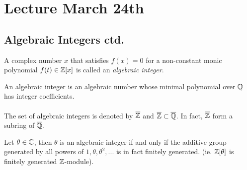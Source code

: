 \section{Lecture March 24th}

\subsection{Algebraic Integers ctd.}

 \begin{definition}
 A complex number $x$ that satisfies $f(x) = 0$ for a non-constant monic polynomial $f(t) \in \mathbb{Z}[x]$ is called an \textit{algebraic integer}.
 \end{definition}
 
 \begin{definition}
 An algebraic integer is an algebraic number whose minimal polynomial over $\mathbb{Q}$ has integer coefficients.\\\\
 The set of algebraic integers is denoted by $\overline{\mathbb{Z}}$ and $\overline{\mathbb{Z}} \subset \overline{\mathbb{Q}}$. In fact, $\overline{\mathbb{Z}}$ form a subring of $\overline{\mathbb{Q}}$.
 \end{definition}
 
 \begin{lemma}[pg. 44 S+T]
 Let $\theta \in \mathbb{C}$, then $\theta$ is an algebraic integer if and only if the additive group generated by all powers of $1, \theta, \theta^2, ... $ is in fact finitely generated. (ie. $\mathbb{Z}[\theta]$ is finitely generated $\mathbb{Z}$-module).
 \end{lemma}
 
